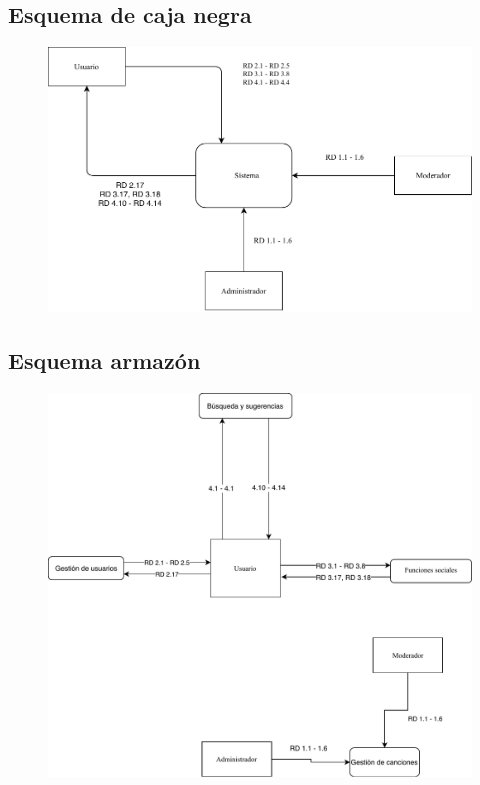 \subsection{Esquema de caja negra}

\begin{figure}[H]
  \centering
  \includegraphics{diagramas/Caja_negra.pdf}
\end{figure}

\subsection{Esquema armazón}

\begin{figure}[H]
  \centering
  \includegraphics[scale=0.9]{diagramas/Esquema_armazon.pdf}
\end{figure}

